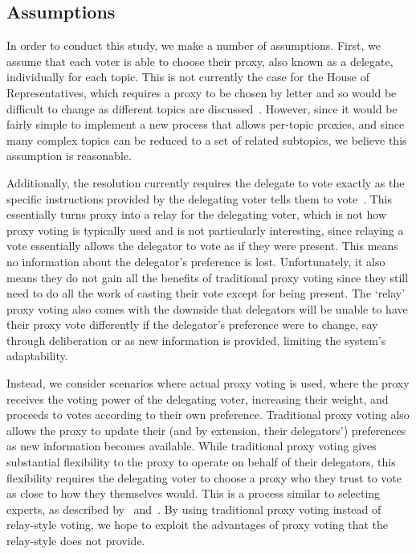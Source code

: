 \subsection{Assumptions}\label{subsec:assumptions}
In order to conduct this study, we make a number of assumptions.
First, we assume that each voter is able to choose their proxy, also known as a
delegate, individually for each topic.
This is not currently the case for the House of Representatives, which requires
a proxy to be chosen by letter and so would be difficult to change as different
topics are discussed~\cite{Congress.gov2020}.
However, since it would be fairly simple to implement a new process that allows
per-topic proxies, and since many complex topics can be reduced to a set of related
subtopics, we believe this assumption is reasonable.

Additionally, the resolution currently requires the delegate to vote exactly as the
specific instructions provided by the delegating voter tells them to
vote~\cite{CERP2020, Congress.gov2020}.
This essentially turns proxy into a relay for the delegating voter, which is not how
proxy voting is typically used and is not particularly interesting, since relaying a
vote essentially allows the delegator to vote as if they were present.
This means no information about the delegator's preference is lost.
Unfortunately, it also means they do not gain all the benefits of traditional proxy
voting since they still need to do all the work of casting their vote except for
being present.
The `relay' proxy voting also comes with the downside that delegators will be unable
to have their proxy vote differently if the delegator's preference were to change,
say through deliberation or as new information is provided, limiting the system's
adaptability.

Instead, we consider scenarios where actual proxy voting is used, where the proxy
receives the voting power of the delegating voter, increasing their weight, and
proceeds to votes according to their own preference.
Traditional proxy voting also allows the proxy to update their (and by extension, their
delegators') preferences as new information becomes available.
While traditional proxy voting gives substantial flexibility to the proxy to
operate on behalf of their delegators, this flexibility requires the delegating voter
to choose a proxy who they trust to vote as close to how they themselves would.
This is a process similar to selecting experts, as described by~\cite{Miller1969}
and~\cite{Mueller1972}.
By using traditional proxy voting instead of relay-style voting, we hope to exploit
the advantages of proxy voting that the relay-style does not provide.

